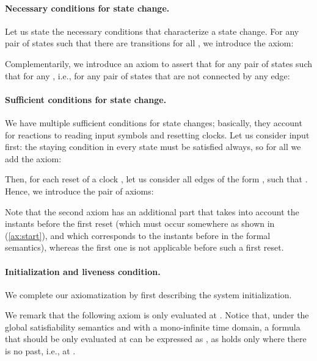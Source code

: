 \documentclass[a4paper]{article}
\newcommand{\frf}[1]{(\ref{#1})}
\theoremstyle{plain}
\theoremstyle{definition}
\begin{document}
\paragraph{Necessary conditions for state change.}
Let us state the necessary conditions that characterize a state change.
For any pair of states  such that there are  transitions  for all , we introduce the axiom:


Complementarily, we introduce an axiom to assert that for any pair of states  such that  for any , i.e., for any pair of states that are not connected by any edge:


\paragraph{Sufficient conditions for state change.}
We have multiple sufficient conditions for state changes; basically, they account for reactions to reading input symbols and resetting clocks.
Let us consider input first: the staying condition in every state must be satisfied always, so for all  we add the axiom:



Then, for each reset of a clock , let us consider all edges of the form , such that .
Hence, we introduce the pair of axioms:

Note that the second axiom has an additional part that takes into account the instants before the first reset (which must occur somewhere as shown in \frf{ax:start}, and which corresponds to the instants before  in the formal semantics), whereas the first one is not applicable before such a first reset.





\paragraph{Initialization and liveness condition.}
We complete our axiomatization by first describing the system initialization.

We remark that the following axiom is only evaluated at .
Notice that, under the global satisfiability semantics and with a mono-infinite time domain, a formula  that should be only evaluated at  can be expressed as , as  holds only where there is no past, i.e., at .
\end{document}
